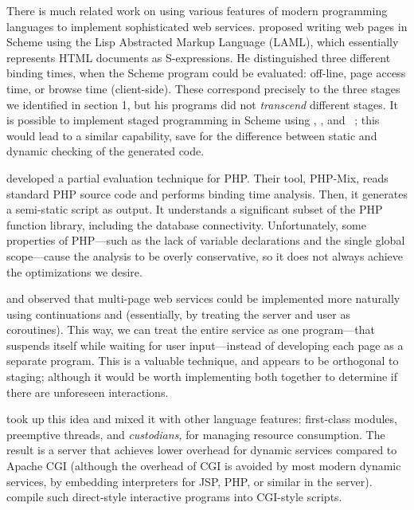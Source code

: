 \documentclass{elsart}
\begin{document}
There is much related work on using various features of modern
programming languages to implement sophisticated web services.
\citet{normark02programmatic} proposed writing web pages in Scheme
using the Lisp Abstracted Markup Language (LAML), which essentially
represents HTML documents as S-expressions.  He distinguished three
different binding times, when the Scheme program could be evaluated:
off-line, page access time, or browse time (client-side).  These
correspond precisely to the three stages we identified in section 1,
but his programs did not \emph{transcend} different stages.  It is
possible to implement staged programming in Scheme using
, , and ~\cite{davies01modal};
this would lead to a similar capability, save for the difference
between static and dynamic checking of the generated code.

\citet{takebe02caching} developed a partial evaluation technique for
PHP.  Their tool, PHP-Mix, reads standard PHP source code and performs
binding time analysis.  Then, it generates a semi-static script as
output.  It understands a significant subset of the PHP function
library, including the database connectivity.  Unfortunately, some
properties of PHP---such as the lack of variable declarations and the
single global scope---cause the analysis to be overly conservative,
so it does not always achieve the optimizations we desire.

\citet{queinnec00influence} and \citet{hughes00generalising} observed
that multi-page web services could be implemented more naturally using
continuations and  (essentially, by treating the server
and user as coroutines).  This way, we can treat the entire service as
one program---that suspends itself while waiting for user
input---instead of developing each page as a separate program.  This
is a valuable technique, and appears to be orthogonal to staging;
although it would be worth implementing both together to determine if
there are unforeseen interactions.

\citet{graunke01programming,graunke03modeling} took up this idea and
mixed it with other language features: first-class modules, preemptive
threads, and \emph{custodians,} for managing resource consumption.
The result is a server that achieves lower overhead for dynamic
services compared to Apache CGI (although the overhead of CGI is
avoided by most modern dynamic services, by embedding interpreters for
JSP, PHP, or similar in the server).  \citet{matthews04automatically}
compile such direct-style interactive programs into CGI-style scripts.
\end{document}
